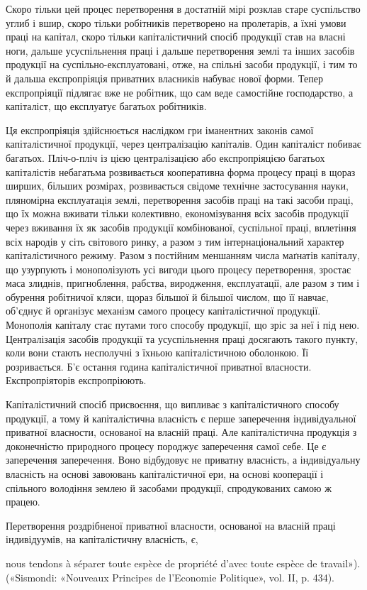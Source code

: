 Скоро тільки цей процес перетворення в достатній мірі розклав
старе суспільство углиб і вшир, скоро тільки робітників
перетворено на пролетарів, а їхні умови праці на капітал, скоро
тільки капіталістичний спосіб продукції став на власні ноги,
дальше усуспільнення праці і дальше перетворення землі та
інших засобів продукції на суспільно-експлуатовані, отже, на
спільні засоби продукції, і тим то й дальша експропріяція приватних
власників набуває нової форми. Тепер експропріяції
підлягає вже не робітник, що сам веде самостійне господарство,
а капіталіст, що експлуатує багатьох робітників.

Ця експропріяція здійснюється наслідком гри іманентних законів
самої капіталістичної продукції, через централізацію капіталів.
Один капіталіст побиває багатьох. Пліч-о-пліч із цією
централізацією або експропріяцією багатьох капіталістів небагатьма
розвивається кооперативна форма процесу праці в
щораз ширших, більших розмірах, розвивається свідоме технічне
застосування науки, пляномірна експлуатація землі, перетворення
засобів праці на такі засоби праці, що їх можна
вживати тільки колективно, економізування всіх засобів продукції
через вживання їх як засобів продукції комбінованої,
суспільної праці, вплетіння всіх народів у сіть світового ринку,
а разом з тим інтернаціональний характер капіталістичного режиму.
Разом з постійним меншанням числа маґнатів капіталу,
що узурпують і монополізують усі вигоди цього процесу перетворення,
зростає маса злиднів, пригноблення, рабства, виродження,
експлуатації, але разом з тим і обурення робітничої
кляси, щораз більшої й більшої числом, що її навчає, об’єднує
й організує механізм самого процесу капіталістичної продукції.
Монополія капіталу стає путами того способу продукції, що
зріс за неї і під нею. Централізація засобів продукції та усуспільнення
праці досягають такого пункту, коли вони стають
несполучні з їхньою капіталістичною оболонкою. Її розривається.
Б’є остання година капіталістичної приватної власности.
Експропріяторів експропріюють.

Капіталістичний спосіб присвоєння, що випливає з капіталістичного
способу продукції, а тому й капіталістична власність
є перше заперечення індивідуальної приватної власности, основаної
на власній праці. Але капіталістична продукція з доконечністю
природного процесу породжує заперечення самої себе.
Це є заперечення заперечення. Воно відбудовує не приватну
власність, а індивідуальну власність на основі завоювань капіталістичної
ери, на основі кооперації і спільного володіння землею
й засобами продукції, спродукованих самою ж працею.

Перетворення роздрібненої приватної власности, основаної
на власній праці індивідуумів, на капіталістичну власність, є,

nous tendons à séparer toute espèce de propriété d’avec toute espèce de
travail»). («Sismondi: «Nouveaux Principes de l’Economie Politique»,
vol. II, p. 434).
